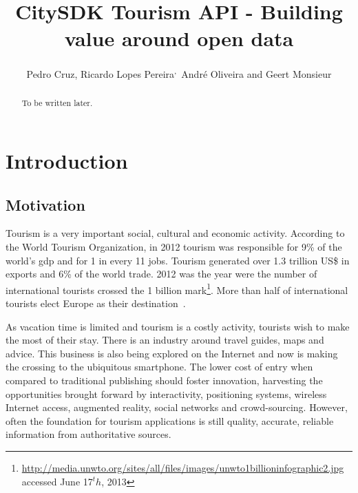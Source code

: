 \documentclass[times]{ettauth}
\begin{document}




\title{CitySDK Tourism API - Building value around open data}
\author{Pedro Cruz,
Ricardo Lopes Pereira\textsuperscript{,}\corrauth\,
Andr\'e Oliveira and 
Geert Monsieur}
\address{
 Instituto Superior T\'ecnico, Avenida Rovisco Pais 1, 1049-001 Lisboa, Portugal\\
 INESC-ID, Av. Prof. Dr. Cavaco Silva, 2744-016 Porto Salvo, Portugal\\
 ISA\\
 European Research Institute in Serivce Science (ERISS), Tilburg University, Warandelaan 2, 5037AB Tilburg, The Netherlands
}

\begin{abstract}
To be written later.
\end{abstract}

\maketitle

\acresetall
\section{Introduction}

\subsection{Motivation}
\label{s:motivation}
Tourism is a very important social, cultural and economic activity.
According to the World Tourism Organization, in 2012 tourism was responsible for 9\% of the world's \ac{gdp} and for 1 in every 11 jobs.
Tourism generated over 1.3 trillion US\$ in exports and 6\% of the world trade.
2012 was the year were the number of international tourists crossed the 1 billion mark\footnote{\url{http://media.unwto.org/sites/all/files/images/unwto1billioninfographic2.jpg} accessed June 17$^th$, 2013}.
More than half of international tourists elect Europe as their destination~\cite{unwto}.

As vacation time is limited and tourism is a costly activity, tourists wish to make the most of their stay.
There is an industry around travel guides, maps and advice.
This business is also being explored on the Internet and now is making the crossing to the ubiquitous smartphone.
The lower cost of entry when compared to traditional publishing should foster innovation, harvesting the opportunities brought forward by interactivity, positioning systems, wireless Internet access, augmented reality, social networks and crowd-sourcing. 
However, often the foundation for tourism applications is still quality, accurate, reliable information from authoritative sources.
\end{document}
